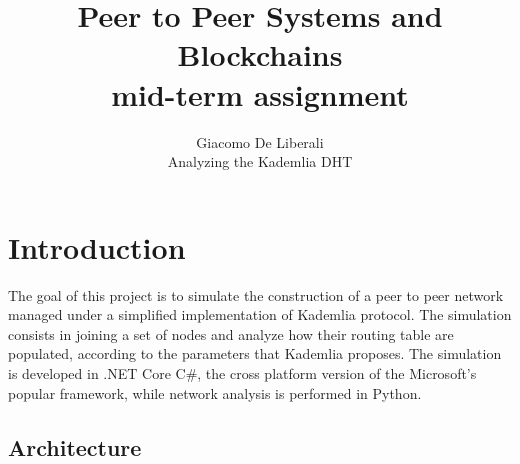 \documentclass[12pt]{article}
\begin{document}
 
 
\title{Peer to Peer Systems and Blockchains \\ mid-term assignment}
\author{Giacomo De Liberali \\ Analyzing the Kademlia DHT}

\maketitle

\tableofcontents

\section{Introduction}

The goal of this project is to simulate the construction of a peer to peer network managed under a simplified implementation of Kademlia protocol. The simulation consists in joining a set of nodes and analyze how their routing table are populated, according to the parameters that Kademlia proposes. The simulation is developed in .NET Core C\#, the cross platform version of the Microsoft's popular framework, while network analysis is performed in Python. 



\subsection{Architecture}
\end{document}
